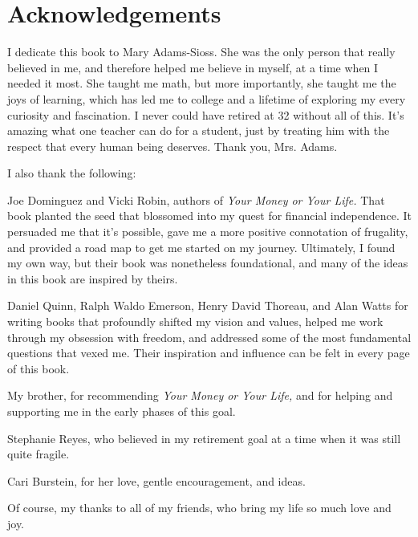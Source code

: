 \chapter{Acknowledgements}
I dedicate this book to Mary Adams-Sioss. She was the only person that really believed in me, and therefore helped me believe in myself, at a time when I needed it most. She taught me math, but more importantly, she taught me the joys of learning, which has led me to college and a lifetime of exploring my every curiosity and fascination. I never could have retired at 32 without all of this. It's amazing what one teacher can do for a student, just by treating him with the respect that every human being deserves. Thank you, Mrs. Adams.

I also thank the following:

Joe Dominguez and Vicki Robin, authors of \emph{Your Money or Your Life.} That book planted the seed that blossomed into my quest for financial independence. It persuaded me that it's possible, gave me a more positive connotation of frugality, and provided a road map to get me started on my journey. Ultimately, I found my own way, but their book was nonetheless foundational, and many of the ideas in this book are inspired by theirs.

Daniel Quinn, Ralph Waldo Emerson, Henry David Thoreau, and Alan Watts for writing books that profoundly shifted my vision and values, helped me work through my obsession with freedom, and addressed some of the most fundamental questions that vexed me. Their inspiration and influence can be felt in every page of this book.

My brother, for recommending \emph{Your Money or Your Life,} and for helping and supporting me in the early phases of this goal.

Stephanie Reyes, who believed in my retirement goal at a time when it was still quite fragile.

Cari Burstein, for her love, gentle encouragement, and ideas.

Of course, my thanks to all of my friends, who bring my life so much love and joy.
